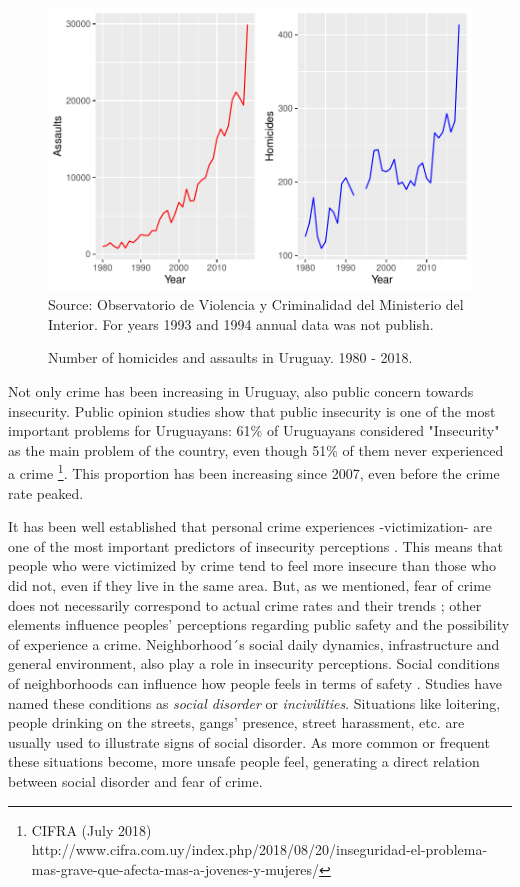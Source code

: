 \documentclass[11pt]{article}
\begin{document}
\begin{figure}[H]
\begin{center}
    \caption{Number of homicides and assaults in Uruguay. 1980 - 2018.}
        \label{fig:homrap19802017}
    \includegraphics{evo_delitos.pdf}
    \footnotesize{Source: Observatorio de Violencia y Criminalidad del Ministerio del Interior. For years 1993 and 1994 annual data was not publish.}
\end{center}
\end{figure}

Not only crime has been increasing in Uruguay, also public concern towards insecurity. Public opinion studies show that public insecurity is one of the most important problems for Uruguayans: 61\% of Uruguayans considered "Insecurity" as the main problem of the country, even though 51\% of them never experienced a crime \footnote{CIFRA (July 2018) http://www.cifra.com.uy/index.php/2018/08/20/inseguridad-el-problema-mas-grave-que-afecta-mas-a-jovenes-y-mujeres/}. This proportion has been increasing since 2007, even before the crime rate peaked.

It has been well established that personal crime experiences -victimization- are one of the most important predictors of insecurity perceptions \citep{cruz2009public}. This means that people who were victimized by crime tend to feel more insecure than those who did not, even if they live in the same area. But, as we mentioned, fear of crime does not necessarily correspond to actual crime rates and their trends \citep{wong2012bringing}; other elements influence peoples' perceptions regarding public safety and the possibility of experience a crime. Neighborhood´s social daily dynamics, infrastructure and general environment, also play a role in insecurity perceptions. Social conditions of neighborhoods can influence how people feels in terms of safety \citep{cruz2009public, brunton2011neighborhoods, valera2014perceived}. Studies have named these conditions as \textit{social disorder} or \textit{incivilities}. Situations like loitering, people drinking on the streets, gangs' presence, street harassment, etc. \citep{bennett1994determinants, valera2014perceived} are usually used to illustrate signs of social disorder. As more common or frequent these situations become, more unsafe people feel, generating a direct relation between social disorder and fear of crime.
\end{document}

